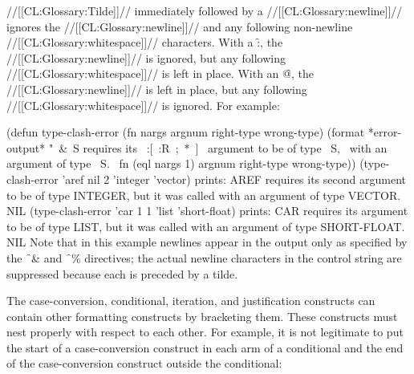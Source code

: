 \endsubsubsection%




//[[CL:Glossary:Tilde]]// immediately followed by a //[[CL:Glossary:newline]]// ignores the //[[CL:Glossary:newline]]//
and any following non-newline //[[CL:Glossary:whitespace]]// characters.
With a \f{:},
 the //[[CL:Glossary:newline]]// is ignored, 
 but any following //[[CL:Glossary:whitespace]]// is left in place.
With an \f{@},
 the //[[CL:Glossary:newline]]// is left in place,
 but any following //[[CL:Glossary:whitespace]]// is ignored.
For example:


\code
 (defun type-clash-error (fn nargs argnum right-type wrong-type)
   (format *error-output*
           "~&~S requires its ~:[~:R~;~*~]~ 
           argument to be of type ~S,~%
           with an argument of type ~S.~%
           fn (eql nargs 1) argnum right-type wrong-type))
 (type-clash-error 'aref nil 2 'integer 'vector)  prints:
AREF requires its second argument to be of type INTEGER,
but it was called with an argument of type VECTOR.
NIL
 (type-clash-error 'car 1 1 'list 'short-float)  prints:
CAR requires its argument to be of type LIST,
but it was called with an argument of type SHORT-FLOAT.
NIL
\endcode
Note that in this example newlines appear in the output only as specified
by the \f{~\&} and \f{~\%} directives; the 
actual newline characters
in the control string are suppressed because each is preceded by a tilde.
                                                                     
\endsubsubsection%

\endsubsection%






The case-conversion, conditional, iteration, and justification
constructs can contain other formatting constructs by bracketing them.
These constructs must nest properly with respect to each other.
For example, it is not legitimate to put the start of a case-conversion
construct in each arm of a conditional and the
end of the case-conversion construct outside the conditional:

